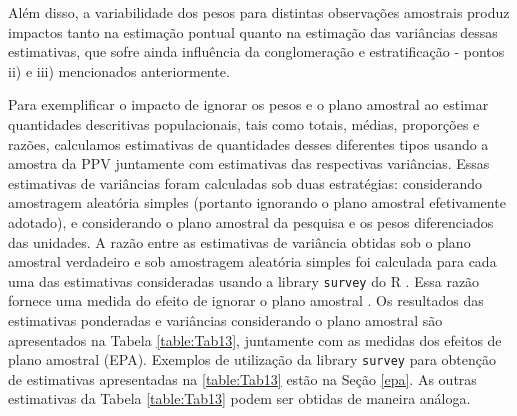\documentclass[]{book}
\numberwithin{example}{chapter}
\numberwithin{remark}{chapter}
\numberwithin{definition}{chapter}
\begin{document}
Além disso, a variabilidade dos pesos para distintas observações
amostrais produz impactos tanto na estimação pontual quanto na estimação
das variâncias dessas estimativas, que sofre ainda influência da
conglomeração e estratificação - pontos ii) e iii) mencionados
anteriormente.

Para exemplificar o impacto de ignorar os pesos e o plano amostral ao
estimar quantidades descritivas populacionais, tais como totais, médias,
proporções e razões, calculamos estimativas de quantidades desses
diferentes tipos usando a amostra da PPV juntamente com estimativas das
respectivas variâncias. Essas estimativas de variâncias foram calculadas
sob duas estratégias: considerando amostragem aleatória simples
(portanto ignorando o plano amostral efetivamente adotado), e
considerando o plano amostral da pesquisa e os pesos diferenciados das
unidades. A razão entre as estimativas de variância obtidas sob o plano
amostral verdadeiro e sob amostragem aleatória simples foi calculada
para cada uma das estimativas consideradas usando a library
\texttt{survey} do R \citep{R-survey} . Essa razão fornece uma medida do
efeito de ignorar o plano amostral . Os resultados das estimativas
ponderadas e variâncias considerando o plano amostral são apresentados
na Tabela \ref{table:Tab13}, juntamente com as medidas dos efeitos de
plano amostral (EPA). Exemplos de utilização da library \texttt{survey}
para obtenção de estimativas apresentadas na \ref{table:Tab13} estão na
Seção \ref{epa}. As outras estimativas da Tabela \ref{table:Tab13} podem
ser obtidas de maneira análoga.
\end{document}
